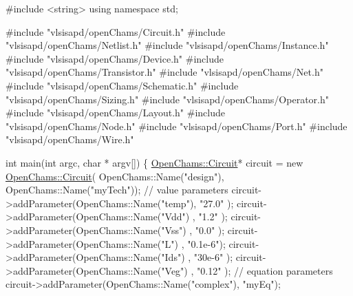 \begin{DoxyCodeInclude}
\textcolor{preprocessor}{#include <string>}
\textcolor{keyword}{using namespace }std;

\textcolor{preprocessor}{#include "vlsisapd/openChams/Circuit.h"}
\textcolor{preprocessor}{#include "vlsisapd/openChams/Netlist.h"}
\textcolor{preprocessor}{#include "vlsisapd/openChams/Instance.h"}
\textcolor{preprocessor}{#include "vlsisapd/openChams/Device.h"}
\textcolor{preprocessor}{#include "vlsisapd/openChams/Transistor.h"}
\textcolor{preprocessor}{#include "vlsisapd/openChams/Net.h"}
\textcolor{preprocessor}{#include "vlsisapd/openChams/Schematic.h"}
\textcolor{preprocessor}{#include "vlsisapd/openChams/Sizing.h"}
\textcolor{preprocessor}{#include "vlsisapd/openChams/Operator.h"}
\textcolor{preprocessor}{#include "vlsisapd/openChams/Layout.h"}
\textcolor{preprocessor}{#include "vlsisapd/openChams/Node.h"}
\textcolor{preprocessor}{#include "vlsisapd/openChams/Port.h"}
\textcolor{preprocessor}{#include "vlsisapd/openChams/Wire.h"}

\textcolor{keywordtype}{int} main(\textcolor{keywordtype}{int} argc, \textcolor{keywordtype}{char} * argv[]) \{
    \hyperlink{class_open_chams_1_1_circuit}{OpenChams::Circuit}* circuit = \textcolor{keyword}{new} \hyperlink{class_open_chams_1_1_circuit}{OpenChams::Circuit}(
      OpenChams::Name(\textcolor{stringliteral}{"design"}), OpenChams::Name(\textcolor{stringliteral}{"myTech"}));
    \textcolor{comment}{// value parameters}
    circuit->addParameter(OpenChams::Name(\textcolor{stringliteral}{"temp"}), \textcolor{stringliteral}{"27.0"}  );
    circuit->addParameter(OpenChams::Name(\textcolor{stringliteral}{"Vdd"}) , \textcolor{stringliteral}{"1.2"}   );
    circuit->addParameter(OpenChams::Name(\textcolor{stringliteral}{"Vss"}) , \textcolor{stringliteral}{"0.0"}   );
    circuit->addParameter(OpenChams::Name(\textcolor{stringliteral}{"L"})   , \textcolor{stringliteral}{"0.1e-6"});
    circuit->addParameter(OpenChams::Name(\textcolor{stringliteral}{"Ids"}) , \textcolor{stringliteral}{"30e-6"} );
    circuit->addParameter(OpenChams::Name(\textcolor{stringliteral}{"Veg"}) , \textcolor{stringliteral}{"0.12"}  );
    \textcolor{comment}{// equation parameters}
    circuit->addParameter(OpenChams::Name(\textcolor{stringliteral}{"complex"}), \textcolor{stringliteral}{"myEq"});


\end{DoxyCodeInclude}
